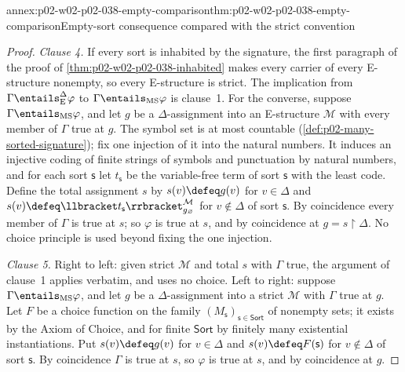 \begin{annexitem}{annex:p02-w02-p02-038-empty-comparison}{thm:p02-w02-p02-038-empty-comparison}{Empty-sort consequence compared with the strict convention}
\begin{proof}
\emph{Clause 4.}  If every sort is inhabited by the signature, the first
paragraph of the proof of \cref{thm:p02-w02-p02-038-inhabited} makes every
carrier of every E-structure nonempty, so every E-structure is strict.  The
implication from \(\Gamma\entails^{\Delta}_{\mathrm E}\varphi\) to
\(\Gamma\entails_{\mathrm{MS}}\varphi\) is clause~1.  For the converse,
suppose \(\Gamma\entails_{\mathrm{MS}}\varphi\), and let \(g\) be a
\(\Delta\)-assignment into an E-structure \(\mathcal M\) with every member of
\(\Gamma\) true at \(g\).  The symbol set is at most countable
(\cref{def:p02-many-sorted-signature}); fix one injection of it into the
natural numbers.  It induces an injective coding of finite strings of
symbols and punctuation by natural numbers, and for each sort \(\mathsf s\)
let \(t_{\mathsf s}\) be the variable-free term of sort \(\mathsf s\) with
the least code.  Define the total assignment \(s\) by \(s(v)\defeq g(v)\) for
\(v\in\Delta\) and \(s(v)\defeq\llbracket t_{\mathsf s}\rrbracket^{\mathcal M}
_{g_{\varnothing}}\) for \(v\notin\Delta\) of sort \(\mathsf s\).  By
coincidence every member of \(\Gamma\) is true at \(s\); so \(\varphi\) is
true at \(s\), and by coincidence at \(g=s{\restriction}\Delta\).  No choice
principle is used beyond fixing the one injection.

\emph{Clause 5.}  Right to left: given strict \(\mathcal M\) and total \(s\)
with \(\Gamma\) true, the argument of clause~1 applies verbatim, and uses no
choice.  Left to right: suppose \(\Gamma\entails_{\mathrm{MS}}\varphi\), and
let \(g\) be a \(\Delta\)-assignment into a strict \(\mathcal M\) with
\(\Gamma\) true at \(g\).  Let \(F\) be a choice function on the family
\((M_{\mathsf s})_{\mathsf s\in\mathsf{Sort}}\) of nonempty sets; it exists
by the Axiom of Choice, and for finite \(\mathsf{Sort}\) by finitely many
existential instantiations.  Put \(s(v)\defeq g(v)\) for \(v\in\Delta\) and
\(s(v)\defeq F(\mathsf s)\) for \(v\notin\Delta\) of sort \(\mathsf s\).  By
coincidence \(\Gamma\) is true at \(s\), so \(\varphi\) is true at \(s\), and
by coincidence at \(g\).
\end{proof}
\end{annexitem}

